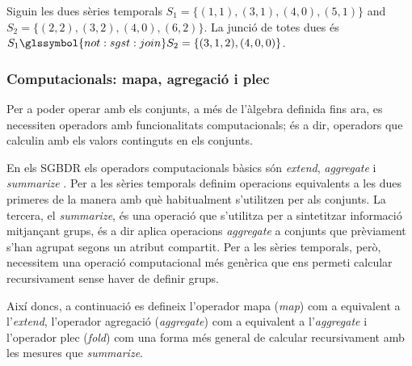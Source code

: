 \begin{example}\label{ex:model:s1s2}
  Siguin les dues sèries temporals $S_1=\{(1,1),(3,1),(4,0),(5,1)\}$
  and $S_2=\{(2,2),(3,2),(4,0),(6,2)\}$.  La junció de totes dues és
  $S_1 \glssymbol{not:sgst:join} S_2 = \{(3,1,2),(4,0,0)\}$.
\end{example}



\subsubsection{Computacionals: mapa, agregació i plec}

Per a poder operar amb els conjunts, a més de l'àlgebra definida fins
ara, es necessiten operadors amb funcionalitats computacionals; és a
dir, operadors que calculin amb els valors continguts en els conjunts. 

En els \gls{SGBDR} els operadors computacionals bàsics són
\emph{extend}, \emph{aggregate} i
\emph{summarize} \parencite[cap.~7]{date04:introduction8}.  Per a les
sèries temporals definim operacions equivalents a les dues primeres de
la manera amb què habitualment s'utilitzen per als conjunts.  La
tercera, el \emph{summarize}, és una operació que s'utilitza per a
sintetitzar informació mitjançant grups, és a dir aplica operacions
\emph{aggregate} a conjunts que prèviament s'han agrupat segons un
atribut compartit.  Per a les sèries temporals, però, necessitem una
operació computacional més genèrica que ens permeti calcular
recursivament sense haver de definir grups.




Així doncs, a continuació es defineix l'operador mapa (\emph{map}) com
a equivalent a l'\emph{extend}, l'operador agregació (\emph{aggregate})
com a equivalent a l'\emph{aggregate} i l'operador plec (\emph{fold})
com una forma més general de calcular recursivament amb les mesures
que \emph{summarize}.



